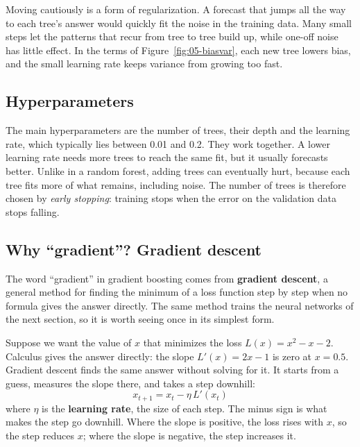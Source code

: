 Moving cautiously is a form of regularization. A forecast that jumps all the way to each tree's answer would quickly fit the noise in the training data. Many small steps let the patterns that recur from tree to tree build up, while one-off noise has little effect. In the terms of Figure~\ref{fig:05-biasvar}, each new tree lowers bias, and the small learning rate keeps variance from growing too fast.

\subsection{Hyperparameters}

The main hyperparameters are the number of trees, their depth and the learning rate, which typically lies between 0.01 and 0.2. They work together. A lower learning rate needs more trees to reach the same fit, but it usually forecasts better. Unlike in a random forest, adding trees can eventually hurt, because each tree fits more of what remains, including noise. The number of trees is therefore chosen by \emph{early stopping}: training stops when the error on the validation data stops falling.

\subsection{Why ``gradient''? Gradient descent}

The word ``gradient'' in gradient boosting comes from \textbf{gradient descent}, a general method for finding the minimum of a loss function step by step when no formula gives the answer directly. The same method trains the neural networks of the next section, so it is worth seeing once in its simplest form.

Suppose we want the value of $x$ that minimizes the loss $L(x) = x^2 - x - 2$. Calculus gives the answer directly: the slope $L'(x) = 2x - 1$ is zero at $x = 0.5$. Gradient descent finds the same answer without solving for it. It starts from a guess, measures the slope there, and takes a step downhill:
\begin{equation}
  x_{t+1} = x_t - \eta \, L'(x_t)
  \label{eq:21-gd}
\end{equation}
where $\eta$ is the \textbf{learning rate}, the size of each step. The minus sign is what makes the step go downhill. Where the slope is positive, the loss rises with $x$, so the step reduces $x$; where the slope is negative, the step increases it.

